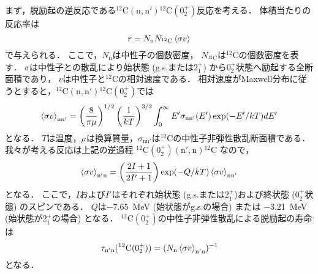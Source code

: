 \documentclass[../master]{subfiles}
\begin{document}
まず，脱励起の逆反応である${}^{12}\mathrm{C}(\mathrm{n},\mathrm{n}'){}^{12}\mathrm{C}(0_2^+)$反応を考える．
体積当たりの反応率は
\begin{equation}
  r = N_{\text{n}}N_{{}^{12}\mathrm{C}}\braket{\sigma v}%
  \label{eq::r}
\end{equation}
で与えられる．
ここで，$N_{\text{n}}$は中性子の個数密度，
$N_{{}^{12}\mathrm{C}}$は${}^{12}\mathrm{C}$の個数密度を表す．
$\sigma$は中性子との散乱により始状態 (g.s.または$2_{1}^{+}$) から$0_2^+$状態へ励起する全断面積であり，
$v$は中性子と${}^{12}\mathrm{C}$の相対速度である．
相対速度がMaxwell分布に従うとすると，${}^{12}\mathrm{C}(\mathrm{n},\mathrm{n'}){}^{12}\mathrm{C} (0_2^+)$では
\begin{equation}
  \braket{\sigma v}_{\mathrm{nn'}} =
  \left(\frac{8}{\pi\mu}\right)^{1/2}\left(\frac{1}{kT}\right)^{3/2}
  \int^{\infty}_{0}E'\sigma_{\mathrm{nn'}}(E')\exp(-E'/kT)dE'
  \label{eq::sigmann'}
\end{equation}
となる．
$T$は温度，$\mu$は換算質量，$\sigma_{\mathrm{n}\mathrm{n}'}$は${}^{12}\mathrm{C}$の中性子非弾性散乱断面積である．
我々が考える反応は上記の逆過程 ${}^{12}\mathrm{C}(0_2^+)(\mathrm{n}',\mathrm{n}){}^{12}\mathrm{C}$ なので，
\begin{equation}
  \braket{\sigma v}_{\mathrm{n'n}} = \left(\frac{2I+1}{2I'+1}\right)
  \exp(-Q/kT)\braket{\sigma v}_{\mathrm{nn'}}
  \label{eq::sigman'n}
\end{equation}
となる．
ここで，$I$および$I'$はそれぞれ始状態 (g.s.または$2_{1}^{+}$)および終状態 ($0_2^+$状態) のスピンである．
$Q$は\SI{-7.65}{\mega\electronvolt} (始状態がg.s.の場合) または
\SI{-3.21}{\mega\electronvolt} (始状態が$2_{1}^{+}$の場合) となる．
${}^{12}\mathrm{C} (0_2^+)$の中性子非弾性散乱による脱励起の寿命は
\begin{equation}
  \tau_{\mathrm{n'n}}({}^{12}\mathrm{C} (0_2^+)) =
  (N_{\mathrm{n}}\braket{\sigma v}_{\mathrm{n'n}})^{-1} %
  \label{eq::tau}
\end{equation}
となる．
\end{document}
